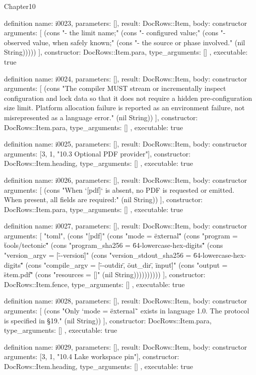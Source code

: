 \begin{lexlean}{Chapter10}
\begin{semanticmodule}
definition{
  name: i0023,
  parameters: [],
  result: DocRows::Item,
  body: constructor{
    arguments: [
      (cons "- the limit name;" (cons "- configured value;" (cons "- observed value, when safely known;" (cons "- the source or phase involved." (nil String)))))
    ],
    constructor: DocRows::Item.para,
    type_arguments: []
  },
  executable: true
}

definition{
  name: i0024,
  parameters: [],
  result: DocRows::Item,
  body: constructor{
    arguments: [
      (cons "The compiler MUST stream or incrementally inspect configuration and lock data so that it does not require a hidden pre-configuration size limit. Platform allocation failure is reported as an environment failure, not misrepresented as a language error." (nil String))
    ],
    constructor: DocRows::Item.para,
    type_arguments: []
  },
  executable: true
}

definition{
  name: i0025,
  parameters: [],
  result: DocRows::Item,
  body: constructor{
    arguments: [3, 1, "10.3 Optional PDF provider"],
    constructor: DocRows::Item.heading,
    type_arguments: []
  },
  executable: true
}

definition{
  name: i0026,
  parameters: [],
  result: DocRows::Item,
  body: constructor{
    arguments: [
      (cons "When `[pdf]` is absent, no PDF is requested or emitted. When present, all fields are required:" (nil String))
    ],
    constructor: DocRows::Item.para,
    type_arguments: []
  },
  executable: true
}

definition{
  name: i0027,
  parameters: [],
  result: DocRows::Item,
  body: constructor{
    arguments: [
      "toml",
      (cons "[pdf]" (cons "mode = \"external\"" (cons "program = \"tools/tectonic\"" (cons "program_sha256 = \"64-lowercase-hex-digits\"" (cons "version_argv = [\"--version\"]" (cons "version_stdout_sha256 = \"64-lowercase-hex-digits\"" (cons "compile_argv = [\"--outdir\", \"{out_dir}\", \"{input}\"]" (cons "output = \"{stem}.pdf\"" (cons "resources = []" (nil String))))))))))
    ],
    constructor: DocRows::Item.fence,
    type_arguments: []
  },
  executable: true
}

definition{
  name: i0028,
  parameters: [],
  result: DocRows::Item,
  body: constructor{
    arguments: [
      (cons "Only `mode = \"external\"` exists in language 1.0. The protocol is specified in §19." (nil String))
    ],
    constructor: DocRows::Item.para,
    type_arguments: []
  },
  executable: true
}

definition{
  name: i0029,
  parameters: [],
  result: DocRows::Item,
  body: constructor{
    arguments: [3, 1, "10.4 Lake workspace pin"],
    constructor: DocRows::Item.heading,
    type_arguments: []
  },
  executable: true
}


\end{semanticmodule}
\end{lexlean}
